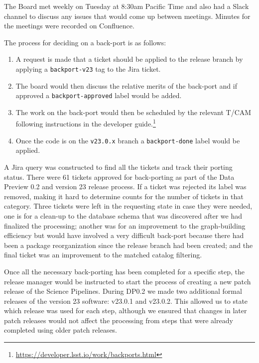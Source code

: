 The Board met weekly on Tuesday at 8:30am Pacific Time and also had a Slack channel to discuss any issues that would come up between meetings.
Minutes for the meetings were recorded on Confluence.

The process for deciding on a back-port is as follows:

\begin{enumerate}

\item A request is made that a ticket should be applied to the release branch by applying a \texttt{backport-v23} tag to the Jira ticket.
\item The board would then discuss the relative merits of the back-port and if approved a \texttt{backport-approved} label would be added.
\item The work on the back-port would then be scheduled by the relevant T/CAM following instructions in the developer guide.\footnote{\url{https://developer.lsst.io/work/backports.html}}
\item Once the code is on the \texttt{v23.0.x} branch a \texttt{backport-done} label would be applied.

\end{enumerate}

A Jira query was constructed to find all the tickets and track their porting status.
There were 61 tickets approved for back-porting as part of the Data Preview 0.2 and version 23 release process.
If a ticket was rejected its label was removed, making it hard to determine counts for the number of tickets in that category.
Three tickets were left in the requesting state in case they were needed, one is for a clean-up to the database schema that was discovered after we had finalized the processing; another was for an improvement to the graph-building efficiency but would have involved a very difficult back-port because there had been a package reorganization since the release branch had been created; and the final ticket was an improvement to the matched catalog filtering.

Once all the necessary back-porting has been completed for a specific step, the release manager would be instructed to start the process of creating a new patch release of the Science Pipelines.
During DP0.2 we made two additional formal releases of the version 23 software: v23.0.1 and v23.0.2.
This allowed us to state which release was used for each step, although we ensured that changes in later patch releases would not affect the processing from steps that were already completed using older patch releases.
